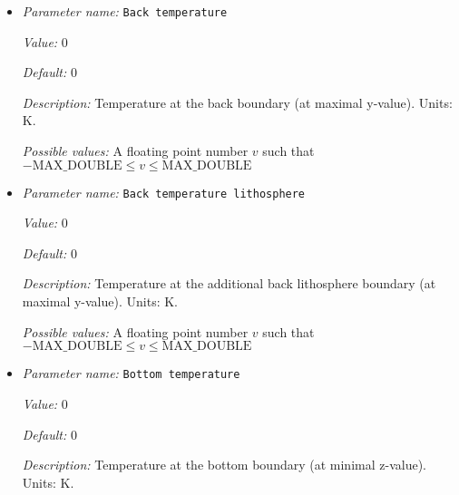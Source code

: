 \begin{itemize}
\item {\it Parameter name:} {\tt Back temperature}
\label{parameters:Boundary temperature model/Box with lithosphere boundary indicators/Back temperature}
\label{parameters:Boundary_20temperature_20model/Box_20with_20lithosphere_20boundary_20indicators/Back_20temperature}


{\it Value:} 0


{\it Default:} 0


{\it Description:} Temperature at the back boundary (at maximal y-value). Units: K.


{\it Possible values:} A floating point number $v$ such that $-\text{MAX\_DOUBLE} \leq v \leq \text{MAX\_DOUBLE}$
\item {\it Parameter name:} {\tt Back temperature lithosphere}
\label{parameters:Boundary temperature model/Box with lithosphere boundary indicators/Back temperature lithosphere}
\label{parameters:Boundary_20temperature_20model/Box_20with_20lithosphere_20boundary_20indicators/Back_20temperature_20lithosphere}


{\it Value:} 0


{\it Default:} 0


{\it Description:} Temperature at the additional back lithosphere boundary (at maximal y-value). Units: K.


{\it Possible values:} A floating point number $v$ such that $-\text{MAX\_DOUBLE} \leq v \leq \text{MAX\_DOUBLE}$
\item {\it Parameter name:} {\tt Bottom temperature}
\label{parameters:Boundary temperature model/Box with lithosphere boundary indicators/Bottom temperature}
\label{parameters:Boundary_20temperature_20model/Box_20with_20lithosphere_20boundary_20indicators/Bottom_20temperature}


{\it Value:} 0


{\it Default:} 0


{\it Description:} Temperature at the bottom boundary (at minimal z-value). Units: K.



\end{itemize}
